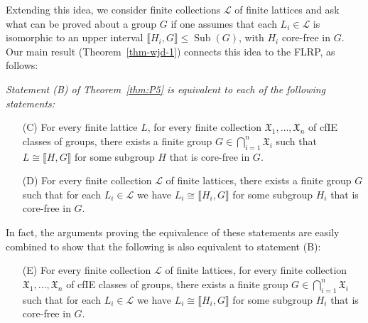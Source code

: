 \documentclass{gen-j-l}
\newcommand{\lb}{\ensuremath{\llbracket}}
\newcommand{\rb}{\ensuremath{\rrbracket}}
\newcommand{\<}{\ensuremath{\langle}}
\renewcommand{\>}{\ensuremath{\rangle}}
\theoremstyle{plain}
\theoremstyle{definition}
\theoremstyle{remark}
\numberwithin{theorem}{section}
\numberwithin{claim}{section}
\numberwithin{equation}{section}
\numberwithin{conjecture}{section}
\renewcommand{\leq}{\ensuremath{\leqslant}}
\newcommand{\Sub}{\ensuremath{\operatorname{Sub}}}
\newcommand{\2}{\ensuremath{\mathbf{2}}}
\newcommand{\3}{\ensuremath{\mathbf{3}}}
\newcommand{\sG}{\ensuremath{\mathfrak{X}}}
\newcommand{\sL}{\ensuremath{\mathscr{L}}}
\begin{document}
Extending this idea, we consider finite collections $\sL$ of finite lattices
and ask what can be proved about a group $G$ if one assumes that each 
$L_i\in \sL$ is isomorphic to an upper interval $\lb H_i, G \rb\leq \Sub(G)$, with
$H_i$ core-free in $G$.  Our main result (Theorem~\ref{thm-wjd-1}) connects this idea to
the \acs{FLRP}, as follows:\\[6pt]
{\it 
Statement (B) of Theorem~\ref{thm:P5} is equivalent to each of the following statements:
\begin{enumerate}
\item[(C)]
For every finite lattice $L$, for every finite collection $\sG_1, \dots, \sG_n$
of \acs{cfIE} classes of groups,
there exists a finite group $G \in \bigcap\limits_{i=1}^n \sG_i$ such that $L \cong
\lb H,G \rb$ for some subgroup $H$ that is core-free in $G$. %
\item[(D)]
For every finite collection $\sL$ of finite lattices, there exists a finite
group $G$ such that for each $L_i \in \sL$ we have 
$L_i\cong \lb H_i, G \rb$ for some subgroup $H_i$ that is core-free in $G$. %
\end{enumerate}}
In fact, the arguments proving the equivalence of these
statements are easily combined to show that the following is also equivalent to
statement (B):
{\it 
\begin{enumerate}
\item[(E)]
For every finite collection $\sL$ of finite lattices, for every finite collection $\sG_1, \dots, \sG_n$
of \acs{cfIE} classes of groups,
there exists a finite group $G \in \bigcap\limits_{i=1}^n \sG_i$ such that for
each $L_i \in \sL$ we have $L_i\cong \lb H_i, G \rb$ for some subgroup
$H_i$ that is core-free in $G$. %
\end{enumerate}
}
\end{document}
